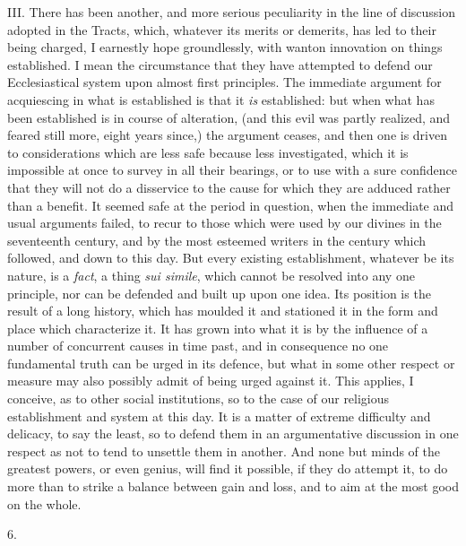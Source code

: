 III.
There has been another, and more serious peculiarity in the line of
discussion adopted in the Tracts, which, whatever its merits or
demerits, has led to their being charged, I earnestly hope
groundlessly, with wanton innovation on things established. I mean the
circumstance that they have attempted to defend our Ecclesiastical
system upon almost first principles. The immediate argument for
acquiescing in what is established is that it \emph{is} established:
but when what has been established is in course of alteration, (and
this evil was partly realized, and feared still more, eight years
since,) the argument ceases, and then one is driven to considerations
which are less safe because less investigated, which it is impossible
at once to survey in all their bearings, or to use with a sure
confidence that they will not do a disservice to the cause for which
they are adduced rather than a benefit. It seemed safe at the
period in question, when the immediate and usual arguments failed, to
recur to those which were used by our divines in the seventeenth
century, and by the most esteemed writers in the century which
followed, and down to this day. But every existing establishment,
whatever be its nature, is a \emph{fact}, a thing \emph{sui simile},
which cannot be resolved into any one principle, nor can be defended
and built up upon one idea. Its position is the result of a long
history, which has moulded it and stationed it in the form and place
which characterize it. It has grown into what it is by the influence
of a number of concurrent causes in time past, and in consequence no
one fundamental truth can be urged in its defence, but what in some
other respect or measure may also possibly admit of being urged
against it. This applies, I conceive, as to other social institutions,
so to the case of our religious establishment and system at this day.
It is a matter of extreme difficulty and delicacy, to say the least,
so to defend them in an argumentative discussion in one respect as not
to tend to unsettle them in another. And none but minds of the
greatest powers, or even genius, will find it possible, if they do
attempt it, to do more than to strike a balance between gain and loss,
and to aim at the most good on the whole.

6.

